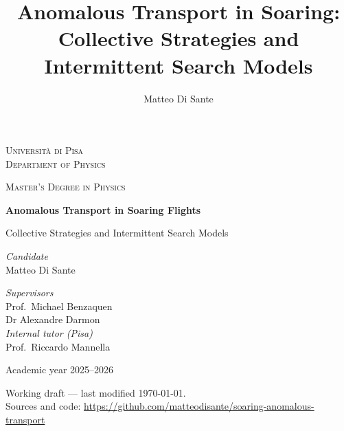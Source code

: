 %


\title{Anomalous Transport in Soaring: Collective Strategies and Intermittent Search Models}
\author{Matteo Di Sante}



\begin{titlepage}
\centering
{\scshape\large Università di Pisa \\ Department of Physics\par}
{\scshape Master's Degree in Physics\par}
\vfill
{\Huge\bfseries Anomalous Transport in Soaring Flights\par}
\vspace{0.8em}
{\LARGE Collective Strategies and Intermittent Search Models\par}
\vfill
\begin{minipage}[t]{0.45\textwidth}
  \raggedright\large
  \textit{Candidate}\\
  Matteo Di Sante\par
\end{minipage}\hfill
\begin{minipage}[t]{0.45\textwidth}
  \raggedleft\large
  \textit{Supervisors}\\
  Prof.\ Michael Benzaquen\\
  Dr Alexandre Darmon\\[0.6em]
  \textit{Internal tutor (Pisa)}\\
  Prof.\ Riccardo Mannella\par
\end{minipage}
\vfill
{\large Academic year 2025--2026\par}
\vspace{1em}
{\small Working draft --- last modified \today.\\
Sources and code: \url{https://github.com/matteodisante/soaring-anomalous-transport}\par}
\end{titlepage}

